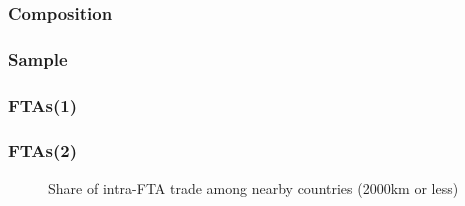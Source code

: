 \documentclass{beamer}
\begin{document}
\begin{frame}[plain]\frametitle{Composition}
\begin{figure}[h!]
\begin{center}
\setlength{\fboxrule}{1pt} %
\setlength{\fboxsep}{.1in} %
\end{center}
\end{figure}
\end{frame}

\begin{frame}[plain]\frametitle{Sample}
\begin{figure}[h!]
\begin{center}
\setlength{\fboxrule}{1pt} %
\setlength{\fboxsep}{.1in} %
\end{center}
\end{figure}
\end{frame}
\fi
\begin{frame}[plain]\frametitle{FTAs(1)}
\begin{figure}[h!]
\begin{center}
\setlength{\fboxrule}{1pt} %
\setlength{\fboxsep}{.1in} %
\end{center}
\end{figure}
\end{frame}

\begin{frame}[plain]\frametitle{FTAs(2)}
\begin{figure}[h!]
\caption{Share of intra-FTA trade among nearby countries (2000km or less)
\label{fig:ftascontig}}
\begin{center}
\setlength{\fboxrule}{1pt} %
\setlength{\fboxsep}{.1in} %
\end{center}
\end{figure}
\end{frame}
\end{document}
